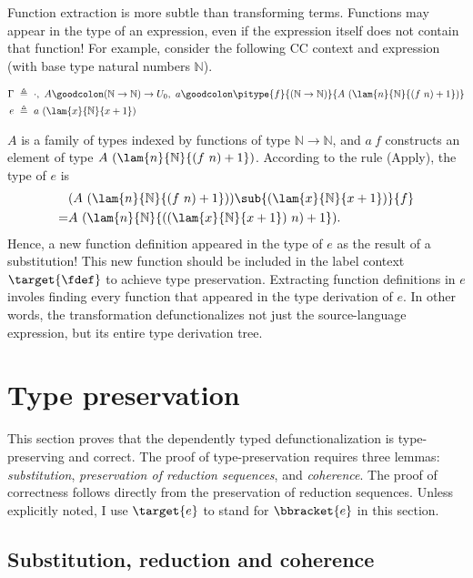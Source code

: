 
Function extraction is more subtle than transforming terms. Functions may appear in the type of an expression, even if the expression itself does not contain that function! For example, consider the following CC context and expression (with base type natural numbers $\mathbb{N}$).

\begin{align*}
	\Gamma\ & \triangleq\ \cdot,\ A \goodcolon (\mathbb{N} \rightarrow \mathbb{N}) \rightarrow U_0,\ 
	a \goodcolon \pitype{f}{(\mathbb{N} \rightarrow \mathbb{N})}{A\ (\lam{n}{\mathbb{N}}{(f\ n) + 1})} \\
	e\ & \triangleq\ a\ (\lam{x}{\mathbb{N}}{x+1})
\end{align*}

$A$ is a family of types indexed by functions of type $\mathbb{N} \rightarrow \mathbb{N}$, and $a\ f$ constructs an element of type $A\ (\lam{n}{\mathbb{N}}{(f\ n) + 1})$. According to the rule (Apply), the type of $e$ is 
\begin{align*}
	& (A\ (\lam{n}{\mathbb{N}}{(f\ n) + 1}))\sub{(\lam{x}{\mathbb{N}}{x+1})}{f}\\
	=& A\ (\lam{n}{\mathbb{N}}{((\lam{x}{\mathbb{N}}{x+1})\ n) + 1}).
\end{align*}
Hence, a new function definition appeared in the type of $e$ as the result of a substitution! This new function should be included in the label context $\target{\fdef}$ to achieve type preservation. Extracting function definitions in $e$ involes finding every function that appeared in the type derivation of $e$. In other words, the transformation defunctionalizes not just the source-language expression, but its entire type derivation tree.


\section{Type preservation}

This section proves that the dependently typed defunctionalization is type-preserving and correct. The proof of type-preservation requires three lemmas: \textit{substitution}, \textit{preservation of reduction sequences}, and \textit{coherence}. The proof of correctness follows directly from the preservation of reduction sequences. Unless explicitly noted, I use $\target{e}$ to stand for $\bbracket{e}$ in this section.

\subsection{Substitution, reduction and coherence}

